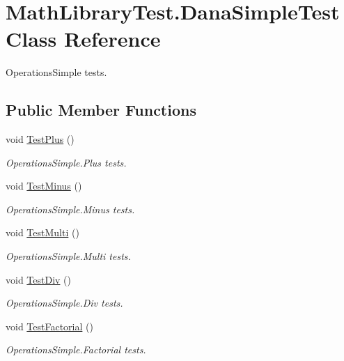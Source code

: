 \hypertarget{classMathLibraryTest_1_1DanaSimpleTest}{}\section{Math\+Library\+Test.\+Dana\+Simple\+Test Class Reference}
\label{classMathLibraryTest_1_1DanaSimpleTest}


Operations\+Simple tests.  


\subsection*{Public Member Functions}
\begin{DoxyCompactItemize}
\item 
void \hyperlink{classMathLibraryTest_1_1DanaSimpleTest_af9f0ba76d61b68ef4bc165818530c3a0}{Test\+Plus} ()
\begin{DoxyCompactList}\small\item\em Operations\+Simple.\+Plus tests. \end{DoxyCompactList}\item 
void \hyperlink{classMathLibraryTest_1_1DanaSimpleTest_adbd49d0988fdaa66142f38d73238a784}{Test\+Minus} ()
\begin{DoxyCompactList}\small\item\em Operations\+Simple.\+Minus tests. \end{DoxyCompactList}\item 
void \hyperlink{classMathLibraryTest_1_1DanaSimpleTest_ad304d5b8df0f62bef4d3f12ae8dfdb37}{Test\+Multi} ()
\begin{DoxyCompactList}\small\item\em Operations\+Simple.\+Multi tests. \end{DoxyCompactList}\item 
void \hyperlink{classMathLibraryTest_1_1DanaSimpleTest_a2db7ba0f1dd7665624c1eeecba0000ea}{Test\+Div} ()
\begin{DoxyCompactList}\small\item\em Operations\+Simple.\+Div tests. \end{DoxyCompactList}\item 
void \hyperlink{classMathLibraryTest_1_1DanaSimpleTest_a8bc466c1cfe224c7857ef7442c19105c}{Test\+Factorial} ()
\begin{DoxyCompactList}\small\item\em Operations\+Simple.\+Factorial tests. \end{DoxyCompactList}\end{DoxyCompactItemize}


